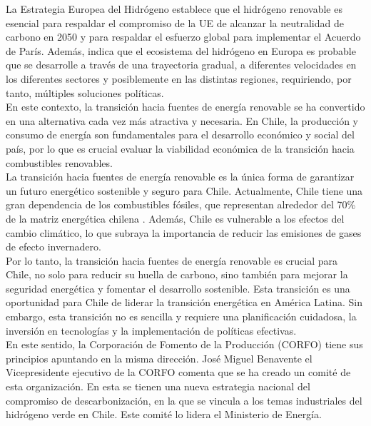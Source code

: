 La Estrategia Europea del Hidrógeno establece que el hidrógeno renovable es esencial para respaldar el compromiso de la UE de alcanzar la neutralidad de carbono en 2050 y para respaldar el esfuerzo global para implementar el Acuerdo de París. Además, indica que el ecosistema del hidrógeno en Europa es probable que se desarrolle a través de una trayectoria gradual, a diferentes velocidades en los diferentes sectores y posiblemente en las distintas regiones, requiriendo, por tanto, múltiples soluciones políticas.\\




En este contexto, la transición hacia fuentes de energía renovable se ha convertido en una alternativa cada vez más atractiva y necesaria. En Chile, la producción y consumo de energía son fundamentales para el desarrollo económico y social del país, por lo que es crucial evaluar la viabilidad económica de la transición hacia combustibles renovables.\\

La transición hacia fuentes de energía renovable es la única forma de garantizar un futuro energético sostenible y seguro para Chile. Actualmente, Chile tiene una gran dependencia de los combustibles fósiles, que representan alrededor del 70\% de la matriz energética chilena . Además, Chile es vulnerable a los efectos del cambio climático, lo que subraya la importancia de reducir las emisiones de gases de efecto invernadero.\\

Por lo tanto, la transición hacia fuentes de energía renovable es crucial para Chile, no solo para reducir su huella de carbono, sino también para mejorar la seguridad energética y fomentar el desarrollo sostenible. Esta transición es una oportunidad para Chile de liderar la transición energética en América Latina. Sin embargo, esta transición no es sencilla y requiere una planificación cuidadosa, la inversión en tecnologías y la implementación de políticas efectivas.\\

En este sentido, la Corporación de Fomento de la Producción (CORFO) tiene sus principios apuntando en la misma dirección. José Miguel Benavente el Vicepresidente ejecutivo de la CORFO comenta que se ha creado un comité de esta organización. En esta se tienen una nueva estrategia nacional del compromiso de descarbonización, en la que se vincula a los temas industriales del hidrógeno verde en Chile. Este comité lo lidera el Ministerio de Energía.\\


